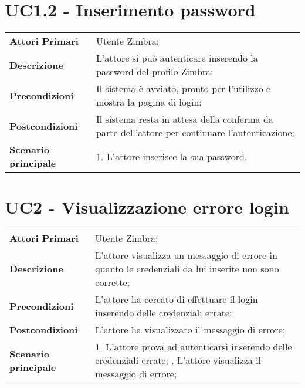 \section{UC1.2 - Inserimento password}
\begin{center}
	\bgroup
	\def\arraystretch{1.8}     
	\begin{longtable}{  p{4cm} | p{9.5cm} } 
		\textbf{Attori Primari} & Utente Zimbra; \\ 
		\textbf{Descrizione} & L’attore si può autenticare inserendo la password del profilo Zimbra; \\ 
		\textbf{Precondizioni}  & Il sistema è avviato, pronto per l’utilizzo e mostra la pagina di login; \\
		\textbf{Postcondizioni} & Il sistema resta in attesa della conferma da parte dell'attore per continuare l'autenticazione;  \\ 
		\textbf{Scenario principale} & 
		1. L’attore inserisce la sua password.
	\end{longtable}
	\egroup
\end{center}

\section{UC2 - Visualizzazione errore login} \label{UC2}
\begin{center}
	\bgroup
	\def\arraystretch{1.8}     
	\begin{longtable}{  p{4cm} | p{9.5cm} } 
		\textbf{Attori Primari} & Utente Zimbra; \\ 
		\textbf{Descrizione} &  L'attore visualizza un messaggio di errore in quanto le credenziali da lui inserite non sono corrette; \\ 
		\textbf{Precondizioni}  & L'attore ha cercato di effettuare il login inserendo delle credenziali errate; \\
		\textbf{Postcondizioni} & L'attore ha visualizzato il messaggio di errore;  \\ 
		\textbf{Scenario principale} & 
		1. L'attore prova ad autenticarsi inserendo delle credenziali errate; \newline
		2. L'attore visualizza il messaggio di errore;
	\end{longtable}
	\egroup
\end{center}


